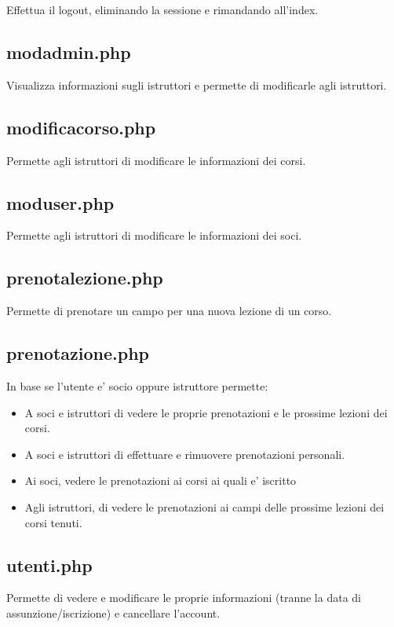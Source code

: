 Effettua il logout, eliminando la sessione e rimandando all'index.

\subsection{modadmin.php}

Visualizza informazioni sugli istruttori e permette di modificarle agli istruttori.

\subsection{modificacorso.php}

Permette agli istruttori di modificare le informazioni dei corsi.

\subsection{moduser.php}

Permette agli istruttori di modificare le informazioni dei soci.

\subsection{prenotalezione.php}

Permette di prenotare un campo per una nuova lezione di un corso.

\subsection{prenotazione.php}

In base se l'utente e' socio oppure istruttore permette:
\begin{itemize}
\item A soci e istruttori di vedere le proprie prenotazioni e le prossime lezioni dei corsi.
\item A soci e istruttori di effettuare e rimuovere prenotazioni personali. 
\item Ai soci, vedere le prenotazioni ai corsi ai quali e' iscritto
\item Agli istruttori, di vedere le prenotazioni ai campi delle prossime lezioni dei corsi tenuti.
\end{itemize}

\subsection{utenti.php}

Permette di vedere e modificare le proprie informazioni (tranne la data di assunzione/iscrizione) e cancellare l'account.